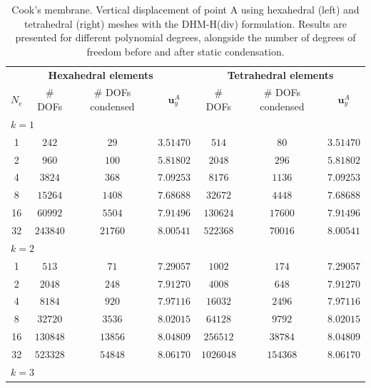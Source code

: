 \documentclass[english,11pt,3p,number,sort&compress]{elsarticle}
\begin{document}
\begin{table}[H]
    \centering
    \caption{Cook's membrane. Vertical displacement of point A using hexahedral (left) and tetrahedral (right) meshes with the DHM-H(div) formulation. Results are presented for different polynomial degrees, alongside the number of degrees of freedom before and after static condensation.}
    \vspace{5pt}
    \begin{tabular}{c c c c | c c c}
        \toprule
        \multicolumn{4}{c}{\textbf{Hexahedral elements}} & \multicolumn{3}{c}{\textbf{Tetrahedral elements}} \\
        \cmidrule(r){1-4} \cmidrule(l){5-7}
        $N_e$ & \# DOFs & \# DOFs condensed & $\bm{u}_y^A$ & \# DOFs & \# DOFs condensed & $\bm{u}_y^A$ \\
        \midrule
        \multicolumn{7}{l}{$k = 1$} \\
        1       & $242   $ & $29   $ & $3.51470$ & $514   $ & $80   $ & $3.51470$ \\
        2       & $960   $ & $100  $ & $5.81802$ & $2048  $ & $296  $ & $5.81802$ \\
        4	    & $3824  $ & $368  $ & $7.09253$ & $8176  $ & $1136 $ & $7.09253$ \\
        8	    & $15264 $ & $1408 $ & $7.68688$ & $32672 $ & $4448 $ & $7.68688$ \\
        16	  	& $60992 $ & $5504 $ & $7.91496$ & $130624$ & $17600$ & $7.91496$ \\
        32	  	& $243840$ & $21760$ & $8.00541$ & $522368$ & $70016$ & $8.00541$ \\
        \midrule
		\multicolumn{7}{l}{$k = 2$} \\
		1       & $513   $ & $71   $ & $7.29057$ & $1002   $ & $174   $ & $7.29057$ \\
        2       & $2048  $ & $248  $ & $7.91270$ & $4008   $ & $648   $ & $7.91270$ \\
        4	    & $8184  $ & $920  $ & $7.97116$ & $16032  $ & $2496  $ & $7.97116$ \\
        8	    & $32720 $ & $3536 $ & $8.02015$ & $64128  $ & $9792  $ & $8.02015$ \\
        16	  	& $130848$ & $13856$ & $8.04809$ & $256512 $ & $38784 $ & $8.04809$ \\
        32	  	& $523328$ & $54848$ & $8.06170$ & $1026048$ & $154368$ & $8.06170$ \\
		\midrule
		\multicolumn{7}{l}{$k = 3$} \\

\end{tabular}
\end{table}
\end{document}

